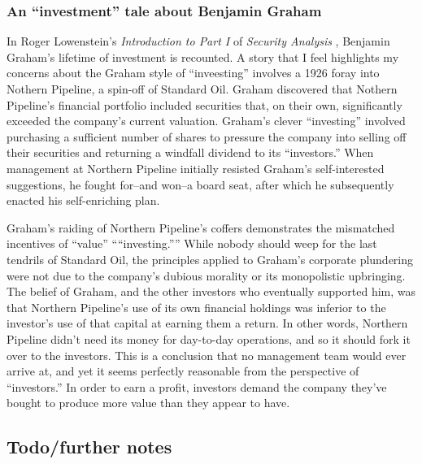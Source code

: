 \subsubsection{An ``investment'' tale about Benjamin Graham}

In Roger Lowenstein's {\it Introduction to Part I} of {\it Security Analysis} \cite{Graham2023}, Benjamin Graham's lifetime of investment is recounted.  A story that I feel highlights my concerns about the Graham style of ``inveesting'' involves a 1926 foray into Nothern Pipeline, a spin-off of Standard Oil.  Graham discovered that Nothern Pipeline's financial portfolio included securities that, on their own, significantly exceeded the company's current valuation.  Graham's clever ``investing'' involved purchasing a sufficient number of shares to pressure the company into selling off their securities and returning a windfall dividend to its ``investors.''  When management at Northern Pipeline initially resisted Graham's self-interested suggestions, he fought for--and won--a board seat, after which he subsequently enacted his self-enriching plan.

Graham's raiding of Northern Pipeline's coffers demonstrates the mismatched incentives of ``value'' ````investing.''''  While nobody should weep for the last tendrils of Standard Oil, the principles applied to Graham's corporate plundering were not due to the company's dubious morality or its monopolistic upbringing.  The belief of Graham, and the other investors who eventually supported him, was that Northern Pipeline's use of its own financial holdings was inferior to the investor's use of that capital at earning them a return.  In other words, Northern Pipeline didn't need its money for day-to-day operations, and so it should fork it over to the investors.  This is a conclusion that no management team would ever arrive at, and yet it seems perfectly reasonable from the perspective of ``investors.''  In order to earn a profit, investors demand the company they've bought to produce more value than they appear to have.


\subsection{Todo/further notes}

